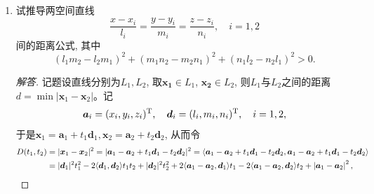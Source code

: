 \begin{2a}
\begin{enumerate}
\item 试推导两空间直线
\[\frac{x-x_i}{l_i}=\frac{y-y_i}{m_i}=\frac{z-z_i}{n_i},\quad i=1,2\]
间的距离公式, 其中\[(l_1m_2-l_2m_1)^2+(m_1n_2-m_2n_1)^2+(n_1l_2-n_2l_1)^2>0.\]
\begin{proof}[解答]
记题设直线分别为\(L_1,L_2\), 取\(\boldsymbol{x_1}\in L_1\), 
\(\boldsymbol{x_2}\in L_2\), 则\(L_1\)与\(L_2\)之间的距离
\(d = \min\left|\boldsymbol{x}_1-\boldsymbol{x}_2\right|\)。记
\[\boldsymbol{a}_i=(x_i,y_i,z_i)^{\rm T},\quad 
\boldsymbol{d}_i=(l_i,m_i,n_i)^{\rm T},\quad i=1,2,\]
于是\(\boldsymbol{x}_1=\boldsymbol{a}_1+t_1\boldsymbol{d}_1,
\boldsymbol{x}_2=\boldsymbol{a}_2+t_2\boldsymbol{d}_2\), 从而令
\[\begin{split}
D(t_1,t_2)&=|\boldsymbol{x}_1-\boldsymbol{x}_2|^2
=|\boldsymbol{a}_1-\boldsymbol{a}_2+t_1\boldsymbol{d}_1-t_2\boldsymbol{d}_2|^2
=\inp{\boldsymbol{a}_1-\boldsymbol{a}_2+t_1\boldsymbol{d}_1-t_2\boldsymbol{d}_2,\boldsymbol{a}_1-\boldsymbol{a}_2+t_1\boldsymbol{d}_1-t_2\boldsymbol{d}_2}\\
&=|\boldsymbol{d}_1|^2t_1^2-2\inp{\boldsymbol{d}_1,\boldsymbol{d}_2}t_1t_2+|\boldsymbol{d}_2|^2t_2^2+2\inp{\boldsymbol{a}_1-\boldsymbol{a}_2,\boldsymbol{d}_1}t_1-2\inp{\boldsymbol{a}_1-\boldsymbol{a}_2,\boldsymbol{d}_2}t_2+\left|\boldsymbol{a}_1-\boldsymbol{a}_2\right|^2,

\end{split}\]
\end{proof}
\end{enumerate}
\end{2a}
